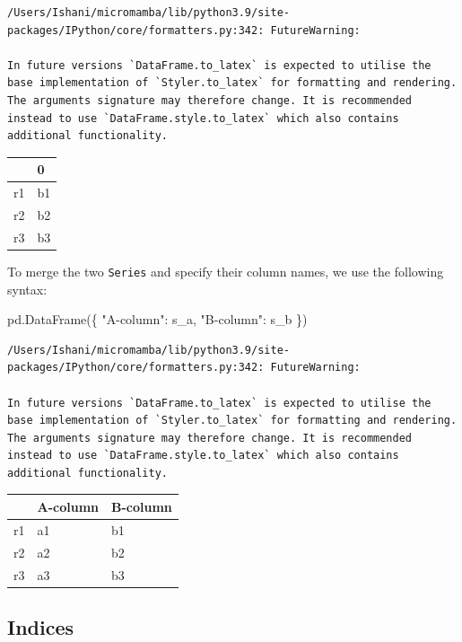 \documentclass[
  letterpaper,
  DIV=11,
  numbers=noendperiod]{scrreprt}
\newenvironment{Shaded}{\begin{snugshade}}{\end{snugshade}}
\newcommand{\NormalTok}[1]{\textcolor[rgb]{0.00,0.23,0.31}{#1}}
\newcommand{\StringTok}[1]{\textcolor[rgb]{0.13,0.47,0.30}{#1}}
\begin{document}
\begin{verbatim}
/Users/Ishani/micromamba/lib/python3.9/site-packages/IPython/core/formatters.py:342: FutureWarning:

In future versions `DataFrame.to_latex` is expected to utilise the base implementation of `Styler.to_latex` for formatting and rendering. The arguments signature may therefore change. It is recommended instead to use `DataFrame.style.to_latex` which also contains additional functionality.
\end{verbatim}

\begin{tabular}{ll}
\toprule
{} &   0 \\
\midrule
r1 &  b1 \\
r2 &  b2 \\
r3 &  b3 \\
\bottomrule
\end{tabular}

To merge the two \texttt{Series} and specify their column names, we use
the following syntax:

\begin{Shaded}
\begin{Highlighting}[]
\NormalTok{pd.DataFrame(\{}
    \StringTok{"A{-}column"}\NormalTok{: s\_a, }
    \StringTok{"B{-}column"}\NormalTok{: s\_b}
\NormalTok{\})}
\end{Highlighting}
\end{Shaded}

\begin{verbatim}
/Users/Ishani/micromamba/lib/python3.9/site-packages/IPython/core/formatters.py:342: FutureWarning:

In future versions `DataFrame.to_latex` is expected to utilise the base implementation of `Styler.to_latex` for formatting and rendering. The arguments signature may therefore change. It is recommended instead to use `DataFrame.style.to_latex` which also contains additional functionality.
\end{verbatim}

\begin{tabular}{lll}
\toprule
{} & A-column & B-column \\
\midrule
r1 &       a1 &       b1 \\
r2 &       a2 &       b2 \\
r3 &       a3 &       b3 \\
\bottomrule
\end{tabular}

\hypertarget{indices}{%
\subsection{Indices}\label{indices}}
\end{document}
